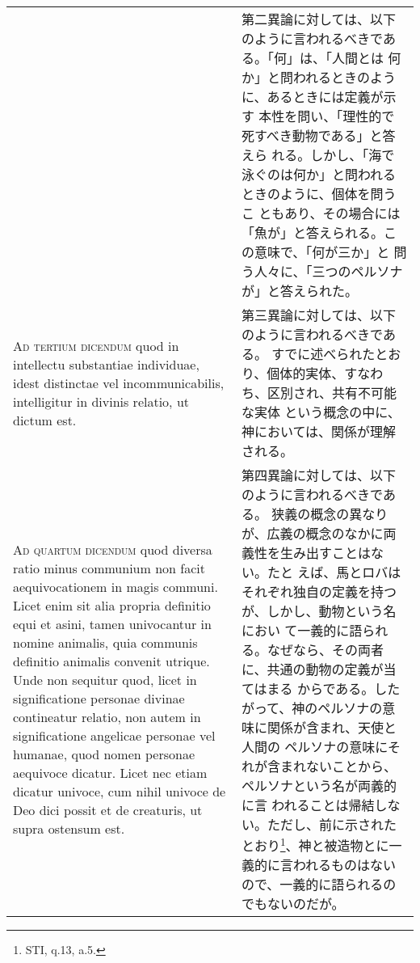 \documentclass[10pt]{jsarticle} %
\begin{document}
\begin{longtable}{p{21em}p{21em}}
&

第二異論に対しては、以下のように言われるべきである。「何」は、「人間とは
 何か」と問われるときのように、あるときには定義が示す
 本性を問い、「理性的で死すべき動物である」と答えら
 れる。しかし、「海で泳ぐのは何か」と問われるときのように、個体を問うこ
 ともあり、その場合には「魚が」と答えられる。この意味で、「何が三か」と
 問う人々に、「三つのペルソナが」と答えられた。


\\



{\scshape Ad tertium dicendum} quod in intellectu substantiae individuae, idest
distinctae vel incommunicabilis, intelligitur in divinis relatio, ut
dictum est.


&

第三異論に対しては、以下のように言われるべきである。
すでに述べられたとおり、個体的実体、すなわち、区別され、共有不可能な実体
 という概念の中に、神においては、関係が理解される。


\\



{\scshape Ad quartum dicendum} quod diversa ratio minus communium non facit
aequivocationem in magis communi. Licet enim sit alia propria definitio
equi et asini, tamen univocantur in nomine animalis, quia communis
definitio animalis convenit utrique. Unde non sequitur quod, licet in
significatione personae divinae contineatur relatio, non autem in
significatione angelicae personae vel humanae, quod nomen personae
aequivoce dicatur. Licet nec etiam dicatur univoce, cum nihil univoce de
Deo dici possit et de creaturis, ut supra ostensum est.


&

第四異論に対しては、以下のように言われるべきである。
狭義の概念の異なりが、広義の概念のなかに両義性を生み出すことはない。たと
 えば、馬とロバはそれぞれ独自の定義を持つが、しかし、動物という名におい
 て一義的に語られる。なぜなら、その両者に、共通の動物の定義が当てはまる
 からである。したがって、神のペルソナの意味に関係が含まれ、天使と人間の
 ペルソナの意味にそれが含まれないことから、ペルソナという名が両義的に言
 われることは帰結しない。ただし、前に示されたとおり\footnote{STI, q.13,
 a.5.}、神と被造物とに一義的に言われるものはないので、一義的に語られるの
 でもないのだが。



\end{longtable}
\end{document}

